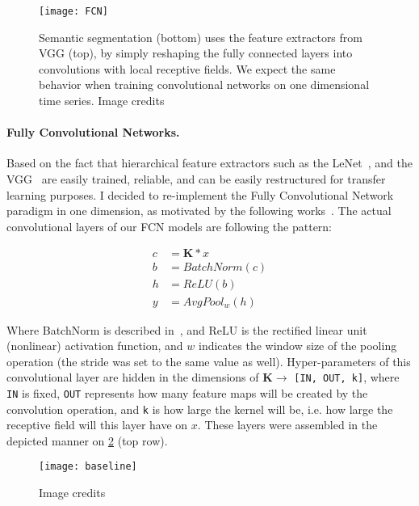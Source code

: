 \begin{figure}
  \centering
  \texttt{[image: FCN]}
  \caption{Semantic segmentation (bottom) uses the feature extractors from VGG (top), by simply reshaping the fully connected layers into convolutions with local receptive fields. We expect the same behavior when training convolutional networks on one dimensional time series. Image credits~\cite{Long_2015_CVPR}}
  \label{fig:FCN}
\end{figure}

\paragraph{Fully Convolutional Networks.}
Based on the fact that hierarchical feature extractors such as the LeNet~\cite{lecun1995convolutional}, and the VGG~\cite{simonyan_very_2014} are easily trained, reliable, and can be easily restructured for transfer learning purposes. I decided to re-implement the Fully Convolutional Network~\cite{Long_2015_CVPR} paradigm in one dimension, as motivated by the following works~\cite{mittelman2015time, langkvist2014review}.
The actual convolutional layers of our FCN models are following the pattern:
\begin{center}\label{eq:conv}
  \begin{equation*}
    \begin{split}
      c &= \mathbf{K} \ast x\\
      b &= BatchNorm(c)\\
      h &= ReLU(b)\\
      y &= AvgPool_w(h)
    \end{split}
  \end{equation*}
\end{center}

Where BatchNorm is described in~\cite{ioffe_batch_2015}, and ReLU is the rectified linear unit (nonlinear) activation function, and $w$ indicates the window size of the pooling operation (the stride was set to the same value as well).
Hyper-parameters of this convolutional layer are hidden in the dimensions of  $\mathbf{K}\rightarrow$ \texttt{[IN, OUT, k]}, where \texttt{IN} is fixed, \texttt{OUT} represents how many feature maps will be created by the convolution operation, and \texttt{k} is how large the kernel will be, i.e. how large the receptive field will this layer have on $x$.
These layers were assembled in the depicted manner on \ref{fig:baseline} (top row).

\begin{figure}
  \centering
  \texttt{[image: baseline]}
  \caption{Image credits~\cite{wang2016time}}
  \label{fig:baseline}
\end{figure}

